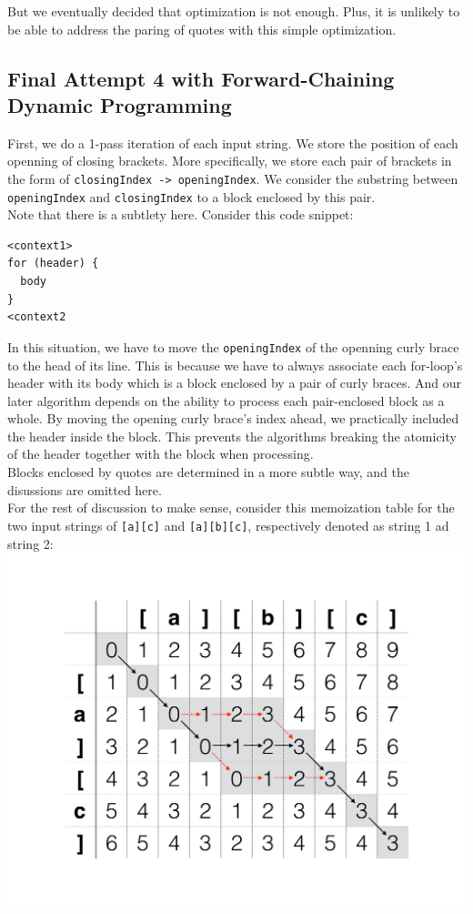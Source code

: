 \documentclass{article}
\begin{document}
But we eventually decided that optimization is not enough. Plus, it is unlikely to be able to address the paring of quotes with this simple optimization.

\subsection{Final Attempt 4 with Forward-Chaining Dynamic Programming}
First, we do a 1-pass iteration of each input string. We store the position of each openning of closing brackets. More specifically, we store each pair of brackets in the form of \texttt{closingIndex -> openingIndex}. We consider the substring between \texttt{openingIndex} and \texttt{closingIndex} to a block enclosed by this pair. \\

Note that there is a subtlety here. Consider this code snippet:
\begin{lstlisting}
<context1>
for (header) {
  body
}
<context2
\end{lstlisting}
In this situation, we have to move the \texttt{openingIndex} of the openning curly brace to the head of its line. This is because we have to always associate each for-loop's header with its body which is a block enclosed by a pair of curly braces. And our later algorithm depends on the ability to process each pair-enclosed block as a whole. By moving the opening curly brace's index ahead, we practically included the header inside the block. This prevents the algorithms breaking the atomicity of the header together with the block when processing.\\

Blocks enclosed by quotes are determined in a more subtle way, and the disussions are omitted here. \\

For the rest of discussion to make sense, consider this memoization table for the two input strings of \texttt{[a][c]} and \texttt{[a][b][c]}, respectively denoted as string 1 ad string 2:\\
\includegraphics[scale=0.6,center]{2.pdf}\\
\end{document}

